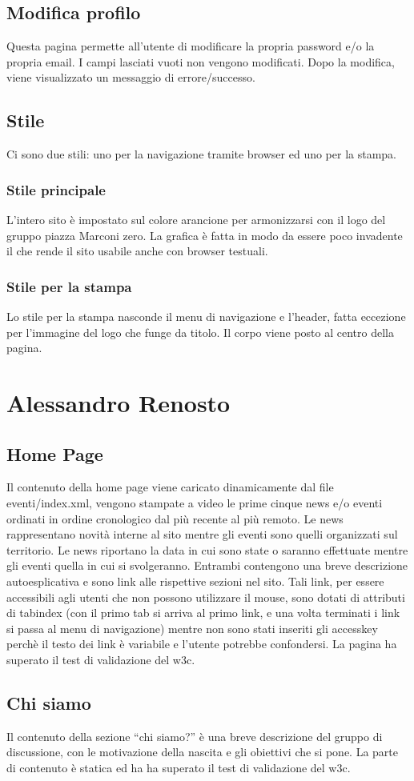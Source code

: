 \documentclass[a4paper,10pt]{article}
\begin{document}
\subsection{Modifica profilo}

Questa pagina permette all'utente di modificare la propria password e/o la propria email. I campi lasciati vuoti non vengono modificati. Dopo la modifica, viene visualizzato un messaggio di errore/successo.

\subsection{Stile}

Ci sono due stili: uno per la navigazione tramite browser ed uno per la stampa.

\subsubsection{Stile principale}
L'intero sito \`e impostato sul colore arancione per armonizzarsi con il logo del gruppo piazza Marconi zero. La grafica \`e fatta in modo da essere poco invadente il che rende il sito usabile anche con browser testuali.

\subsubsection{Stile per la stampa}
Lo stile per la stampa nasconde il menu di navigazione e l'header, fatta eccezione per l'immagine del logo che funge da titolo. Il corpo viene posto al centro della pagina.

\section{Alessandro Renosto}

\subsection{Home Page}

Il contenuto della home page viene caricato dinamicamente dal file eventi/index.xml, vengono stampate a video le prime cinque news e/o eventi ordinati in ordine cronologico dal pi\`u recente al pi\`u remoto. Le news rappresentano novit\`a interne al sito mentre gli eventi sono quelli organizzati sul territorio. Le news riportano la data in cui sono state o saranno effettuate mentre gli eventi quella in cui si svolgeranno. Entrambi contengono una breve descrizione autoesplicativa e sono link alle rispettive sezioni nel sito. Tali link, per essere accessibili agli utenti che non possono utilizzare il mouse, sono dotati di attributi di tabindex (con il primo tab si arriva al primo link, e una volta terminati i link si passa al menu di navigazione) mentre non sono stati inseriti gli accesskey perch\`e il testo dei link \`e variabile e l'utente potrebbe confondersi. La pagina ha superato il test di validazione del w3c.

\subsection{Chi siamo}

Il contenuto della sezione ``chi siamo?'' \`e una breve descrizione del gruppo di discussione, con le motivazione della nascita e gli obiettivi che si pone. La parte di contenuto \`e statica ed ha ha superato il test di validazione del w3c.
\end{document}
